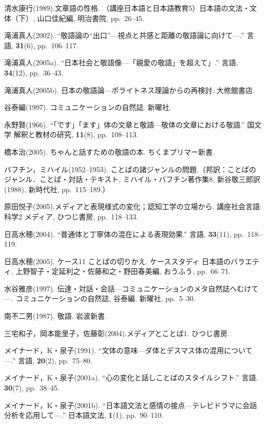 \documentclass[japanese]{jnlp_1.3c}
\begin{document}
\begin{thebibliography}{3}
 \item 
清水康行(1989).文章語の性格. （講座日本語と日本語教育5）日本語の文法・文体（下）{\unskip}, 山口佳紀編, 明治書院, pp.~26--45.
 \item 
滝浦真人(2002). ``敬語論の“出口”—視点と共感と距離の敬語論に向けて—.'' 言語, \textbf{31}(6), pp.~106--117.
 \item 
滝浦真人(2005a). ``日本社会と敬語像—「親愛の敬語」を超えて」{\unskip}.'' 言語, \textbf{34}(12), pp.~36--43.
 \item 
滝浦真人(2005b). 日本の敬語論—ポライトネス理論からの再検討. 大修館書店.
 \item 
谷泰編(1997). コミュニケーションの自然誌. 新曜社.
 \item 
永野賢(1966). ``「です」「ます」体の文章と敬語—敬体の文章における敬語.'' 国文学 解釈と教材の研究, \textbf{11}(8), pp.~108--113.
 \item 
橋本治(2005). ちゃんと話すための敬語の本. ちくまプリマー新書.
 \item 
バフチン，ミハイル(1952--1953). ことばの諸ジャンルの問題.（邦訳：ことばのジャンル．ことば・対話・テキスト, ミハイル・バフチン著作集8, 新谷敬三郎訳(1988), 新時代社, pp.~115--189.）
 \item 
原田悦子(2005).メディアと表現様式の変化；認知工学の立場から. 講座社会言語科学2 メディア, ひつじ書房, pp.~118--133.
 \item 
日高水穂(2004). ``普通体と丁寧体の混在による表現効果.'' 言語, \textbf{33}(11), pp.~118--119.
 \item 
日高水穂(2005). ケース11 ことばの切りかえ. ケーススタディ 日本語のバラエティ, 上野智子・定延利之・佐藤和之・野田春美編, おうふう, pp.~66--71.
 \item 
水谷雅彦(1997). 伝達・対話・会話—コミュニケーションのメタ自然誌へむけて—. コミュニケーションの自然誌, 谷泰編. 新曜社, pp.~5--30.
 \item 
南不二男(1987). 敬語. 岩波新書.
 \item 
三宅和子，岡本能里子，佐藤彰(2004).メディアとことば1. ひつじ書房.
 \item 
メイナード，K・泉子(1991). ``文体の意味—ダ体とデスマス体の混用について—.'' 言語, \textbf{20}(2), pp.~75--80.
 \item 
メイナード，K・泉子(2001a). ``心の変化と話しことばのスタイルシフト.'' 言語, \textbf{30}(7), pp.~38--45.
 \item 
メイナード，K・泉子(2001b). ``日本語文法と感情の接点—テレビドラマに会話分析を応用して—.'' 日本語文法, \textbf{1}(1), pp.~90--110.
 \item 

\end{thebibliography}
\end{document}
